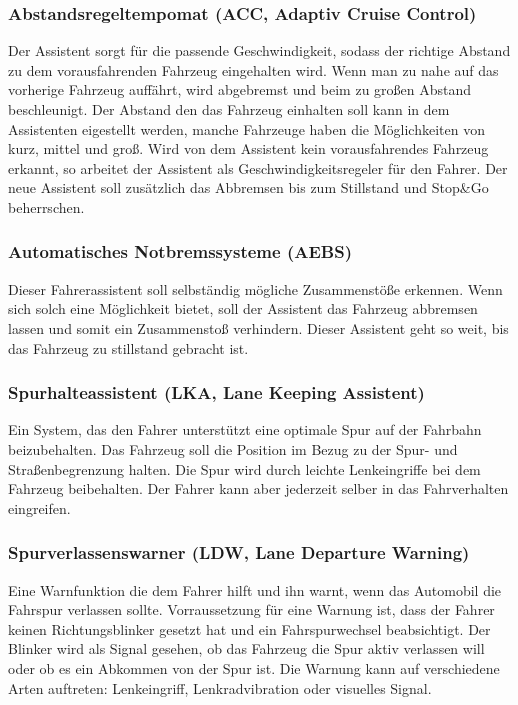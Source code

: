         \subsubsection{Abstandsregeltempomat (ACC, Adaptiv Cruise Control)}
        Der Assistent sorgt für die passende Geschwindigkeit, sodass der richtige Abstand
        zu dem vorausfahrenden Fahrzeug eingehalten wird. Wenn man zu nahe auf das vorherige
        Fahrzeug auffährt, wird abgebremst und beim zu großen Abstand beschleunigt. Der Abstand
        den das Fahrzeug einhalten soll kann in dem Assistenten eigestellt werden, manche Fahrzeuge
        haben die Möglichkeiten von kurz, mittel und groß. Wird von dem Assistent kein vorausfahrendes
        Fahrzeug erkannt, so arbeitet der Assistent als Geschwindigkeitsregeler für den Fahrer. Der
        neue Assistent soll zusätzlich das Abbremsen bis zum Stillstand und Stop\&Go beherrschen.
        ~\cite{assistenzsysteme.PB2} ~\cite{Audi.PB1}

        \subsubsection{Automatisches Notbremssysteme (AEBS)}
        Dieser Fahrerassistent soll selbständig mögliche Zusammenstöße erkennen. Wenn sich solch
        eine Möglichkeit bietet, soll der Assistent das Fahrzeug abbremsen lassen und somit ein
        Zusammenstoß verhindern. Dieser Assistent geht so weit, bis das Fahrzeug zu stillstand 
        gebracht ist.
        ~\cite{notbremsassi.PB1} ~\cite{assistenzsysteme.PB1}  ~\cite{assistenzsysteme.PB2}
        ~\cite{notbremsassi.PB2}
        
        \subsubsection{Spurhalteassistent (LKA, Lane Keeping Assistent)}
        Ein System, das den Fahrer unterstützt eine optimale Spur auf der Fahrbahn beizubehalten.
        Das Fahrzeug soll die Position im Bezug zu der Spur- und Straßenbegrenzung halten. Die
        Spur wird durch leichte Lenkeingriffe bei dem Fahrzeug beibehalten. Der Fahrer kann aber
        jederzeit selber in das Fahrverhalten eingreifen.
        ~\cite{spurhalte.PB1} ~\cite{assistenzsysteme.PB1} ~\cite{spurhalte.PB2}  ~\cite{assistenzsysteme.PB2}

        \subsubsection{Spurverlassenswarner (LDW, Lane Departure Warning)}
        Eine Warnfunktion die dem Fahrer hilft und ihn warnt, wenn das Automobil die Fahrspur
        verlassen sollte. Vorraussetzung für eine Warnung ist, dass der Fahrer keinen Richtungsblinker
        gesetzt hat und ein Fahrspurwechsel beabsichtigt. Der Blinker wird als Signal gesehen, ob das 
        Fahrzeug die Spur aktiv verlassen will oder ob es ein Abkommen von der Spur ist. Die 
        Warnung kann auf verschiedene Arten auftreten: Lenkeingriff, Lenkradvibration oder visuelles
        Signal.
        ~\cite{assistenzsysteme.PB2} ~\cite{LDW.PB1}

